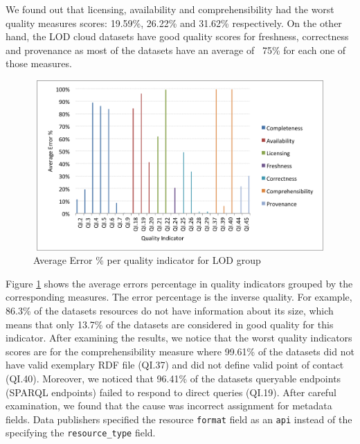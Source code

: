 \documentclass[onecolumn, crcready]{../../Util/LaTEX/iosart2c}
\begin{document}
We found out that licensing, availability and comprehensibility had the worst quality measures scores: 19.59\%, 26.22\% and 31.62\% respectively. On the other hand, the LOD cloud datasets have good quality scores for freshness, correctness and provenance as most of the datasets have an average of ~75\% for each one of those measures.

\begin{figure}[ht]
  \centering
    \includegraphics[height=6.5cm, width=12cm]{LOD_quality_indicators_grouped.png}
  \caption{Average Error \% per quality indicator for LOD group}
  \label{fig:average-error-lod-group}
\end{figure}

Figure \ref{fig:average-error-lod-group} shows the average errors percentage in quality indicators grouped by the corresponding measures. The error percentage is the inverse quality. For example, 86.3\% of the datasets resources do not have information about its size, which means that only 13.7\% of the datasets are considered in good quality for this indicator. After examining the results, we notice that the worst quality indicators scores are for the comprehensibility measure where 99.61\% of the datasets did not have valid exemplary RDF file (QI.37) and did not define valid point of contact (QI.40). Moreover, we noticed that 96.41\% of the datasets queryable endpoints (SPARQL endpoints) failed to respond to direct queries (QI.19). After careful examination, we found that the cause was incorrect assignment for metadata fields. Data publishers specified the resource \texttt{format} field as an \texttt{api} instead of the specifying the \texttt{resource\_type} field.
\end{document}
